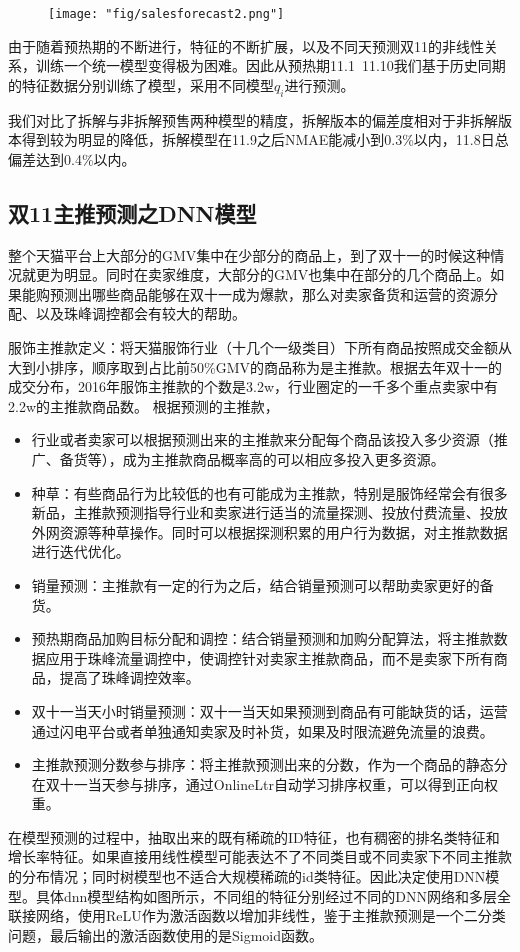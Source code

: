 \begin{figure}[!h]
	\centering
	\texttt{[image: "fig/salesforecast2.png"]}
	\caption{}
	\label{fig:sf2}
\end{figure}

由于随着预热期的不断进行，特征的不断扩展，以及不同天预测双11的非线性关系，训练一个统一模型变得极为困难。因此从预热期11.1~11.10我们基于历史同期的特征数据分别训练了模型，采用不同模型$q_i$进行预测。

我们对比了拆解与非拆解预售两种模型的精度，拆解版本的偏差度相对于非拆解版本得到较为明显的降低，拆解模型在11.9之后NMAE能减小到0.3\%以内，11.8日总偏差达到0.4\%以内。

\subsection{双11主推预测之DNN模型}

整个天猫平台上大部分的GMV集中在少部分的商品上，到了双十一的时候这种情况就更为明显。同时在卖家维度，大部分的GMV也集中在部分的几个商品上。如果能购预测出哪些商品能够在双十一成为爆款，那么对卖家备货和运营的资源分配、以及珠峰调控都会有较大的帮助。

服饰主推款定义：将天猫服饰行业（十几个一级类目）下所有商品按照成交金额从大到小排序，顺序取到占比前50\%GMV的商品称为是主推款。根据去年双十一的成交分布，2016年服饰主推款的个数是3.2w，行业圈定的一千多个重点卖家中有2.2w的主推款商品数。 根据预测的主推款，
\begin{itemize}
\item 行业或者卖家可以根据预测出来的主推款来分配每个商品该投入多少资源（推广、备货等），成为主推款商品概率高的可以相应多投入更多资源。
\item 种草：有些商品行为比较低的也有可能成为主推款，特别是服饰经常会有很多新品，主推款预测指导行业和卖家进行适当的流量探测、投放付费流量、投放外网资源等种草操作。同时可以根据探测积累的用户行为数据，对主推款数据进行迭代优化。
\item 销量预测：主推款有一定的行为之后，结合销量预测可以帮助卖家更好的备货。
\item 预热期商品加购目标分配和调控：结合销量预测和加购分配算法，将主推款数据应用于珠峰流量调控中，使调控针对卖家主推款商品，而不是卖家下所有商品，提高了珠峰调控效率。
\item 双十一当天小时销量预测：双十一当天如果预测到商品有可能缺货的话，运营通过闪电平台或者单独通知卖家及时补货，如果及时限流避免流量的浪费。
\item 主推款预测分数参与排序：将主推款预测出来的分数，作为一个商品的静态分在双十一当天参与排序，通过OnlineLtr自动学习排序权重，可以得到正向权重。
\end{itemize}
在模型预测的过程中，抽取出来的既有稀疏的ID特征，也有稠密的排名类特征和增长率特征。如果直接用线性模型可能表达不了不同类目或不同卖家下不同主推款的分布情况；同时树模型也不适合大规模稀疏的id类特征。因此决定使用DNN模型。具体dnn模型结构如图所示，不同组的特征分别经过不同的DNN网络和多层全联接网络，使用ReLU作为激活函数以增加非线性，鉴于主推款预测是一个二分类问题，最后输出的激活函数使用的是Sigmoid函数。

